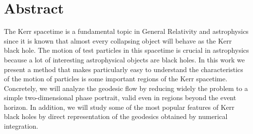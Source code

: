 \begingroup
\let\clearpage\relax
\let\cleardoublepage\relax
\let\cleardoublepage\relax

\chapter*{Abstract}

\vspace{6ex}


The Kerr spacetime is a fundamental topic in General Relativity and astrophysics since it is known that almost every collapsing object will behave as the Kerr black hole. The motion of test particles in this spacetime is crucial in astrophysics because a lot of interesting astrophysical objects are black holes. In this work we present a method that makes particularly easy to understand the characteristics of the motion of particles is some important regions of the Kerr spacetime. Concretely, we will analyze the geodesic flow by reducing widely the problem to a simple two-dimensional phase portrait, valid even in regions beyond the event horizon. In addition, we will study some of the most popular features of Kerr black holes by direct representation of the geodesics obtained by numerical integration.

\vspace{2ex}
\endgroup			

\vfill